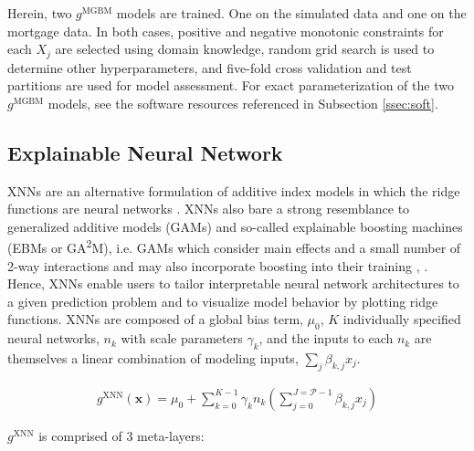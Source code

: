 \documentclass[information,article,submit,moreauthors,pdftex]{definitions/mdpi}
\begin{document}
Herein, two $g^\text{MGBM}$ models are trained.  One on the simulated data and one on the mortgage data. In both cases, positive and negative monotonic constraints for each $X_j$ are selected using domain knowledge, random grid search is used to determine other hyperparameters, and five-fold cross validation and test partitions are used for model assessment. For exact parameterization of the two $g^\text{MGBM}$ models, see the software resources referenced in Subsection \ref{ssec:soft}. 


\subsection{Explainable Neural Network}\label{ssec:xnn}

XNNs are an alternative formulation of additive index models in which the ridge functions are neural networks \cite{wf_xnn}. XNNs also bare a strong resemblance to generalized additive models (GAMs) and so-called explainable boosting machines (EBMs or GA\textsuperscript{2}M), i.e. GAMs which consider main effects and a small number of 2-way interactions and may also incorporate boosting into their training \cite{esl}, \cite{ga2m}.  Hence, XNNs enable users to tailor interpretable neural network architectures to a given prediction problem and to visualize model behavior by plotting ridge functions. XNNs are composed of a global bias term, $\mu_0$, $K$ individually specified neural networks, $n_k$ with scale parameters $\gamma_k$, and the inputs to each $n_k$ are themselves a linear combination of modeling inputs, $\sum_j\beta_{k,j}x_j$.

\begin{equation}
\begin{aligned}
\label{eq:xnn}
g^{\text{XNN}}(\mathbf{x}) = \mu_0 + \sum_{k=0}^{K-1}\gamma_k n_k(\sum^{J=\mathcal{P}-1}_{j=0}\beta_{k, j}x_j)
\end{aligned}
\end{equation}

\noindent $g^{\text{XNN}}$ is comprised of 3 meta-layers:
\end{document}
